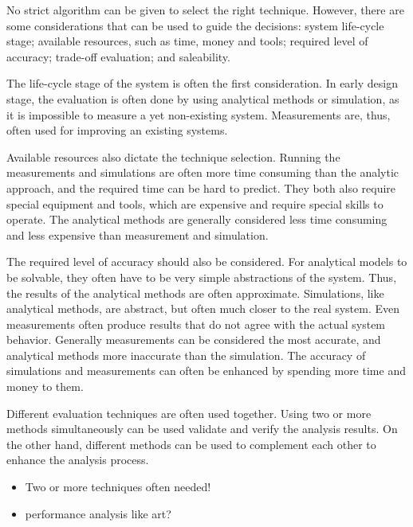 No strict algorithm   can be given to select the right technique. However, there are some considerations that can be used to guide the decisions: system life-cycle stage; available resources, such as time, money and tools; required level of accuracy; trade-off evaluation; and saleability. \cite{jain:1991:AOCSPA}

The life-cycle stage of the system is often the first consideration. In early design stage, the evaluation is often done by using analytical methods or simulation, as it is impossible to measure a yet non-existing system. Measurements are, thus, often used for improving an existing systems. \cite{jain:1991:AOCSPA}

Available resources also dictate the technique selection. Running the measurements and simulations are often more time consuming \cite{Fujimoto:1990:PDE} than the analytic approach, and the required time can be hard to predict. They both also require special equipment and tools, which are expensive and require special skills to operate. The analytical methods are generally considered less time consuming and less expensive than measurement and simulation.  \cite{jain:1991:AOCSPA}

The required level of accuracy should also be considered. For analytical models to be solvable, they often have to be very simple abstractions of the system. Thus, the results of the analytical methods are often approximate. Simulations, like analytical methods, are abstract, but often much closer to the real system. Even measurements often produce results that do not agree with the actual system behavior. Generally measurements can be considered the most accurate, and analytical methods more inaccurate than the simulation. The accuracy of simulations and measurements can often be enhanced by spending more time and money to them. \cite{jain:1991:AOCSPA}

Different evaluation techniques are often used together. Using two or more methods simultaneously can be used validate and verify the analysis results. On the other hand, different methods can be used to complement each other to enhance the analysis process. \cite{jain:1991:AOCSPA}

\begin{itemize}
\item Two or more techniques often needed!
\item performance analysis like art?
\end{itemize}

